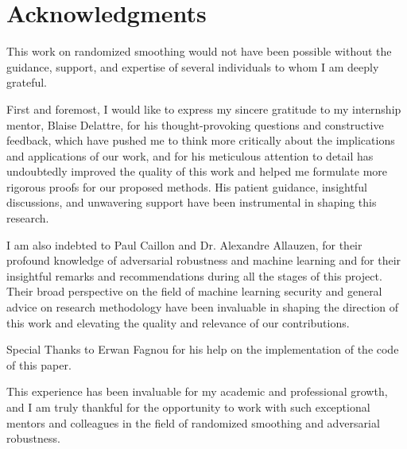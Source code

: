 \section*{Acknowledgments}
This work on randomized smoothing would not have been possible without the guidance, support, and expertise of several individuals to whom I am deeply grateful.

First and foremost, I would like to express my sincere gratitude to my internship mentor, Blaise Delattre, for his thought-provoking questions and constructive feedback, which have pushed me to think more critically about the implications and applications of our work, and for his meticulous attention to detail has undoubtedly improved the quality of this work and helped me formulate more rigorous proofs for our proposed methods.
His patient guidance, insightful discussions, and unwavering support have been instrumental in shaping this research.

I am also indebted to Paul Caillon and Dr. Alexandre Allauzen, for their profound knowledge of adversarial robustness and machine learning and for their insightful remarks and recommendations during all the stages of this project.
Their broad perspective on the field of machine learning security and general advice on research methodology have been invaluable in shaping the direction of this work and elevating the quality and relevance of our contributions.

Special Thanks to Erwan Fagnou for his help on the implementation of the code of this paper.

This experience has been invaluable for my academic and professional growth, and I am truly thankful for the opportunity to work with such exceptional mentors and colleagues in the field of randomized smoothing and adversarial robustness.
